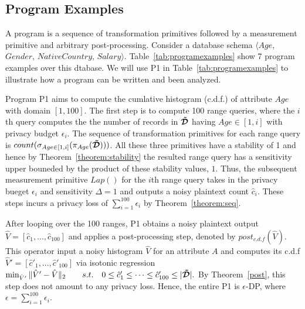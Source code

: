\subsection{Program Examples}
A \system program is a sequence of transformation primitives followed by a measurement primitive and arbitrary post-processing. Consider a database schema $\langle Age$, $Gender$, $NativeCountry$, $Salary\rangle$. Table~\ref{tab:programexamples} show 7 \system program examples over this dtabase. We will use P1 in Table~\ref{tab:programexamples} to illustrate how a \system program can be written and been analyzed. 

Program P1 aims to compute the cumlative histogram (c.d.f.) of attribute $Age$ with domain $[1,100]$. The first step is to compute 100 range queries, where the $i$th query computes the the number of records in $\boldsymbol{\tilde{\mathcal{D}}}$ having $Age \in [1,i]$ with privacy budget $\epsilon_i$.  The sequence of transformation primitives for each range query is $count(\sigma_{Age\in [1,i]}(\pi_{Age}(\boldsymbol{\tilde{\mathcal{D}}})))$. All these three primitives have a stability of 1 and hence by Theorem~\ref{theorem:stability} the resulted range query has a sensitivity upper bouneded by the product of these stability values, $1$. Thus, the subsequent measurement primitive $Lap()$ for the $i$th range query takes in the privacy bueget $\epsilon_i$ and sensitivity $\Delta=1$ and outputs a noisy plaintext count $\hat{c}_i$. These steps incurs a privacy loss of $\sum_{i=1}^{100} \epsilon_i$ by Theorem~\ref{theorem:seq}.

After looping over the 100 ranges, P1 obtains a  noisy plaintext output $\hat{V}=[\hat{c}_1,...,\hat{c}_{100}]$ and applies a post-processing step, denoted by $post_{c.d.f}(\hat{V})$. This operator input a noisy histogram $\hat{V}$ for an attribute $A$ and computes its c.d.f $\hat{V}'=[\hat{c}'_1,...,\hat{c}'_{100}]$ via isotonic regression 
$\min_{\hat{V}'} \|\hat{V}'-\hat{V}\|_2 ~~~~~~s.t.~~~ 0\leq\hat{c}'_1\leq \cdots \leq \hat{c}'_{100} \leq |\boldsymbol{\tilde{\mathcal{D}}}|.$
By Theorem~\ref{post}, this step does not amount to any privacy loss. Hence, the entire P1 is $\epsilon$-DP, where $\epsilon=\sum_{i=1}^{100} \epsilon_i$. 


